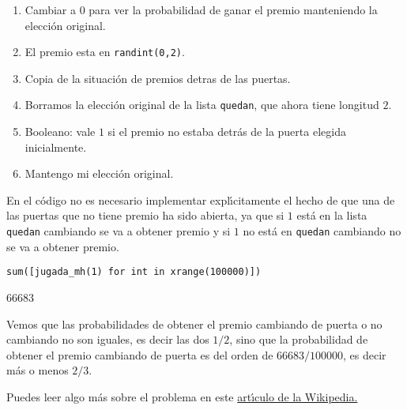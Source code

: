 \begin{enumerate}
 \item Cambiar a $0$ para ver la probabilidad de ganar el  premio manteniendo 
la elecci\'on original.
 
 \item  El premio esta en \lstinline|randint(0,2)|.
 
 \item Copia de la situaci\'on de premios detras de las puertas.
 
 \item Borramos la elecci\'on original de la lista {\tt quedan},  que ahora 
tiene longitud $2$.
 
 \item Booleano: vale $1$ si el premio no estaba detr\'as de la puerta elegida 
inicialmente.
 
 \item Mantengo mi elecci\'on original.
 
\end{enumerate}




En el c\'odigo no es necesario implementar expl\'{\i}citamente el hecho de que 
una de las puertas
que no tiene premio ha sido abierta, ya que si $1$ est\'a en la lista {\tt
quedan} cambiando se va a obtener premio y si $1$ no est\'a en {\tt quedan}
cambiando no se va a obtener premio. 


\begin{lstlisting}
sum([jugada_mh(1) for int in xrange(100000)])
\end{lstlisting}
\begin{Output}
66683 
\end{Output}
 
 Vemos que las probabilidades de obtener el premio cambiando de puerta o no
cambiando no son iguales, es decir las dos $1/2$,  sino que la probabilidad de
obtener el premio cambiando de puerta es del orden de $66683/100000$, es decir
m\'as o menos $2/3.$ 
  
 Puedes leer algo m\'as sobre el problema en este
\href{http://en.wikipedia.org/wiki/Monty_Hall_problem}{art\'{\i}culo de la
Wikipedia.}

 
 
